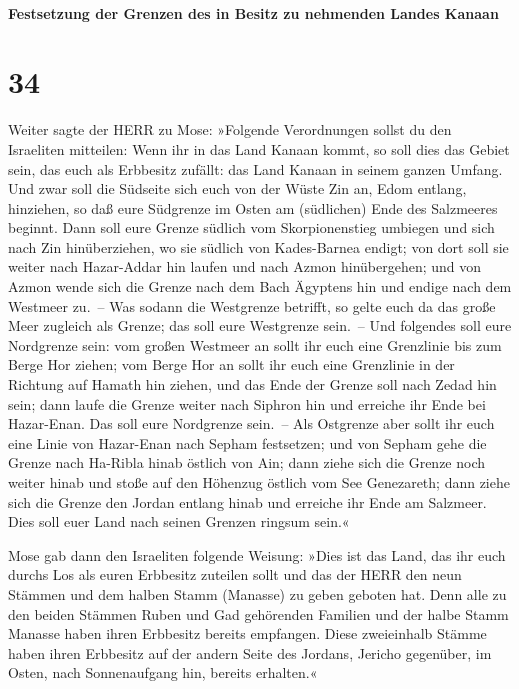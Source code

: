 \hypertarget{festsetzung-der-grenzen-des-in-besitz-zu-nehmenden-landes-kanaan}{%
\paragraph{Festsetzung der Grenzen des in Besitz zu nehmenden Landes
Kanaan}\label{festsetzung-der-grenzen-des-in-besitz-zu-nehmenden-landes-kanaan}}

\hypertarget{section-33}{%
\section{34}\label{section-33}}

Weiter sagte der HERR zu Mose: »Folgende
Verordnungen sollst du den Israeliten mitteilen: Wenn ihr in das Land
Kanaan kommt, so soll dies das Gebiet sein, das euch als Erbbesitz
zufällt: das Land Kanaan in seinem ganzen Umfang. Und zwar
soll die Südseite sich euch von der Wüste Zin an, Edom entlang,
hinziehen, so daß eure Südgrenze im Osten am (südlichen) Ende des
Salzmeeres beginnt. Dann soll eure Grenze südlich vom
Skorpionenstieg umbiegen und sich nach Zin hinüberziehen, wo sie südlich
von Kades-Barnea endigt; von dort soll sie weiter nach Hazar-Addar hin
laufen und nach Azmon hinübergehen; und von Azmon wende
sich die Grenze nach dem Bach Ägyptens hin und endige nach dem Westmeer
zu.~-- Was sodann die Westgrenze betrifft, so gelte euch
da das große Meer zugleich als Grenze; das soll eure Westgrenze sein.~--
Und folgendes soll eure Nordgrenze sein: vom großen
Westmeer an sollt ihr euch eine Grenzlinie bis zum Berge Hor ziehen;
vom Berge Hor an sollt ihr euch eine Grenzlinie in der
Richtung auf Hamath hin ziehen, und das Ende der Grenze soll nach Zedad
hin sein; dann laufe die Grenze weiter nach Siphron hin
und erreiche ihr Ende bei Hazar-Enan. Das soll eure Nordgrenze sein.~--
Als Ostgrenze aber sollt ihr euch eine Linie von
Hazar-Enan nach Sepham festsetzen; und von Sepham gehe
die Grenze nach Ha-Ribla hinab östlich von Ain; dann ziehe sich die
Grenze noch weiter hinab und stoße auf den Höhenzug östlich vom See
Genezareth; dann ziehe sich die Grenze den Jordan entlang
hinab und erreiche ihr Ende am Salzmeer. Dies soll euer Land nach seinen
Grenzen ringsum sein.«

Mose gab dann den Israeliten folgende Weisung: »Dies ist
das Land, das ihr euch durchs Los als euren Erbbesitz zuteilen sollt und
das der HERR den neun Stämmen und dem halben Stamm (Manasse) zu geben
geboten hat. Denn alle zu den beiden Stämmen Ruben und
Gad gehörenden Familien und der halbe Stamm Manasse haben ihren
Erbbesitz bereits empfangen. Diese zweieinhalb Stämme
haben ihren Erbbesitz auf der andern Seite des Jordans, Jericho
gegenüber, im Osten, nach Sonnenaufgang hin, bereits erhalten.«

